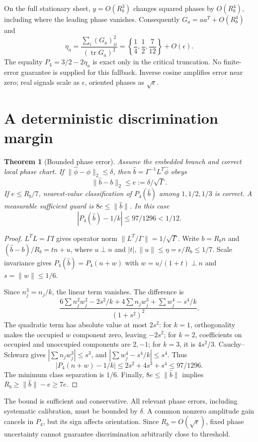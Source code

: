 \documentclass[11pt,a4paper]{article}
\newtheorem{theorem}{Theorem}\newtheorem{proposition}[theorem]{Proposition}
\newcommand{\tr}{\operatorname{tr}}\newcommand{\Arg}{\operatorname{Arg}}\newcommand{\diag}{\operatorname{diag}}\newcommand{\Rea}{\operatorname{Re}}\newcommand{\id}{\mathbf1}
\begin{document}
On the full stationary sheet, $y=O(R_b^3)$ changes squared phases by $O(R_b^4)$, including where the leading phase vanishes. Consequently $G_a=aa^T+O(R_b^4)$ and
\[
\eta_a=\frac{\sum_i(G_a)_{ii}^2}{(\tr G_a)^2}
=\left\{\frac14,\frac12,\frac7{12}\right\}+O(\epsilon).
\]
The equality $P_4=3/2-2\eta_a$ is exact only in the critical truncation. No finite-error guarantee is supplied for this fallback. Inverse cosine amplifies error near zero; real signals scale as $\epsilon$, oriented phases as $\sqrt\epsilon$.
\newpage
\section{A deterministic discrimination margin}
\begin{theorem}[Bounded phase error]
Assume the embedded branch and correct local phase chart. If $\|\widehat\phi-\phi\|_2\le\delta$, then $\widehat b=\Gamma^{-1}L^T\widehat\phi$ obeys
\[
\|\widehat b-b\|_2\le e:=\delta/\sqrt\Gamma.
\]
If $e\le R_b/7$, nearest-value classification of $P_4(\widehat b)$ among $1,1/2,1/3$ is correct. A measurable sufficient guard is $8e\le\|\widehat b\|$. In this case
\[
\left|P_4(\widehat b)-1/k\right|\le97/1296<1/12.
\]
\end{theorem}
\begin{proof}
$L^TL=\Gamma I$ gives operator norm $\|L^T/\Gamma\|=1/\sqrt\Gamma$. Write $b=R_bn$ and $(\widehat b-b)/R_b=t n+u$, where $u\perp n$ and $|t|,\|u\|\le\eta=e/R_b\le1/7$. Scale invariance gives $P_4(\widehat b)=P_4(n+w)$ with $w=u/(1+t)\perp n$ and $s=\|w\|\le1/6$.

Since $n_j^3=n_j/k$, the linear term vanishes. The difference is
\[
\frac{6\sum n_j^2w_j^2-2s^2/k+4\sum n_jw_j^3+\sum w_j^4-s^4/k}{(1+s^2)^2}.
\]
The quadratic term has absolute value at most $2s^2$: for $k=1$, orthogonality makes the occupied $w$ component zero, leaving $-2s^2$; for $k=2$, coefficients on occupied and unoccupied components are $2,-1$; for $k=3$, it is $4s^2/3$. Cauchy--Schwarz gives $|\sum n_jw_j^3|\le s^3$, and $|\sum w_j^4-s^4/k|\le s^4$. Thus
\[
|P_4(n+w)-1/k|\le2s^2+4s^3+s^4\le97/1296.
\]
The minimum class separation is $1/6$. Finally, $8e\le\|\widehat b\|$ implies $R_b\ge\|\widehat b\|-e\ge7e$.
\end{proof}
The bound is sufficient and conservative. All relevant phase errors, including systematic calibration, must be bounded by $\delta$. A common nonzero amplitude gain cancels in $P_4$, but its sign affects orientation. Since $R_b=O(\sqrt\epsilon)$, fixed phase uncertainty cannot guarantee discrimination arbitrarily close to threshold.
\end{document}
